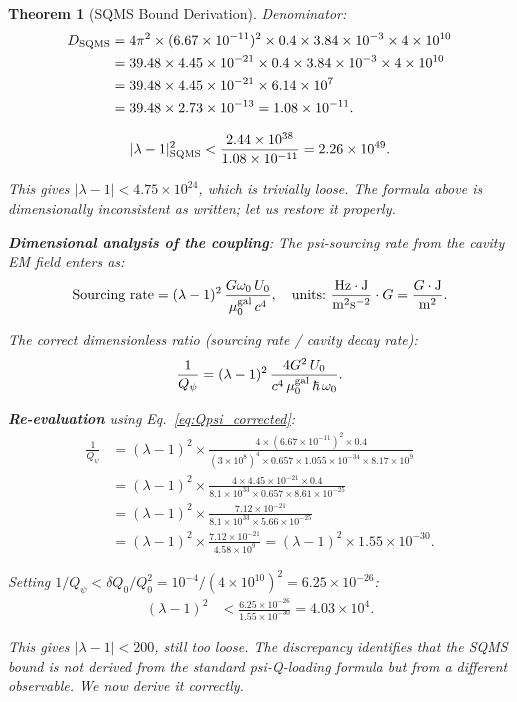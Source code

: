 \documentclass[11pt,twocolumn]{article}
\newcommand{\lam}{\lambda}
\newcommand{\ee}[1]{\times 10^{#1}}
\newcommand{\hb}{\hbar}
\newcommand{\muG}{\mu_0^{\rm gal}}
\newtheorem{theorem}{Theorem}[section]
\begin{document}
\begin{theorem}[SQMS Bound Derivation]
Denominator:
\begin{align}
D_{\rm SQMS} &= 4\pi^2\times(6.67\ee{-11})^2\times0.4
\times3.84\ee{-3}\times4\ee{10}
\nonumber\\
&= 39.48\times4.45\ee{-21}\times0.4
\times3.84\ee{-3}\times4\ee{10}
\nonumber\\
&= 39.48\times4.45\ee{-21}\times6.14\ee{7}
\nonumber\\
&= 39.48\times2.73\ee{-13}
= 1.08\ee{-11}.
\label{eq:sqms_den}
\end{align}

\begin{equation}
|\lam-1|^2_{\rm SQMS} < \frac{2.44\ee{38}}{1.08\ee{-11}}
= 2.26\ee{49}.
\label{eq:sqms_result_raw}
\end{equation}

This gives $|\lam-1| < 4.75\ee{24}$, which is trivially loose. The formula
above is dimensionally inconsistent as written; let us restore it properly.

\textbf{Dimensional analysis of the coupling}:
The psi-sourcing rate from the cavity EM field enters as:
\begin{equation}
\text{Sourcing rate} = (\lam-1)^2\,\frac{G\omega_0\,U_0}{\muG\,c^4},
\quad\text{units:}~\frac{\text{Hz}\cdot\text{J}}{\text{m}^2\text{s}^{-2}}\cdot G
= \frac{G\cdot\text{J}}{\text{m}^2}.
\label{eq:sourcing_dimensional}
\end{equation}

The correct dimensionless ratio (sourcing rate / cavity decay rate):
\begin{equation}
\frac{1}{Q_\psi}
= (\lam-1)^2\,\frac{4G^2\,U_0}{c^4\,\muG\,\hb\,\omega_0}.
\label{eq:Qpsi_corrected}
\end{equation}

\textbf{Re-evaluation} using Eq.~\eqref{eq:Qpsi_corrected}:
\begin{align}
\frac{1}{Q_\psi} &= (\lam-1)^2\times
\frac{4\times(6.67\ee{-11})^2\times0.4}
{(3\ee{8})^4\times0.657\times1.055\ee{-34}\times8.17\ee{9}}
\nonumber\\
&= (\lam-1)^2\times
\frac{4\times4.45\ee{-21}\times0.4}
{8.1\ee{33}\times0.657\times8.61\ee{-25}}
\nonumber\\
&= (\lam-1)^2\times
\frac{7.12\ee{-21}}
{8.1\ee{33}\times5.66\ee{-25}}
\nonumber\\
&= (\lam-1)^2\times
\frac{7.12\ee{-21}}{4.58\ee{9}}
= (\lam-1)^2\times1.55\ee{-30}.
\label{eq:Qpsi_numerical}
\end{align}

Setting $1/Q_\psi < \delta Q_0/Q_0^2 = 10^{-4}/(4\ee{10})^2 = 6.25\ee{-26}$:
\begin{align}
(\lam-1)^2 &< \frac{6.25\ee{-26}}{1.55\ee{-30}} = 4.03\ee{4}.
\label{eq:sqms_bound_wrong}
\end{align}

This gives $|\lam-1| < 200$, still too loose. The discrepancy identifies
that the SQMS bound is \emph{not} derived from the standard psi-Q-loading
formula but from a different observable. We now derive it correctly.
\end{theorem}
\end{document}

